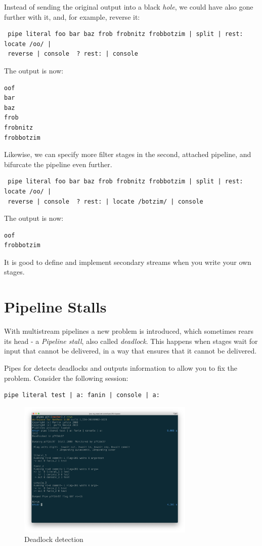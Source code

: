Instead of sending the original output into a black \emph{hole}, we
could have also gone further with it, and, for example, reverse it:
\begin{lstlisting}
 pipe literal foo bar baz frob frobnitz frobbotzim | split | rest: locate /oo/ |
 reverse | console  ? rest: | console
\end{lstlisting}
The output is now:
\begin{verbatim}
oof
bar
baz
frob
frobnitz
frobbotzim
\end{verbatim}
Likewise, we can specify more filter stages in the second, attached
pipeline, and bifurcate the pipeline even further.

\begin{lstlisting}
 pipe literal foo bar baz frob frobnitz frobbotzim | split | rest: locate /oo/ |
 reverse | console  ? rest: | locate /botzim/ | console
\end{lstlisting}
The output is now:
\begin{verbatim}
oof
frobbotzim
\end{verbatim}




It is good to define and implement secondary streams when you write
your own stages.


\chapter{Pipeline Stalls}
With multistream pipelines a new problem is introduced, which
sometimes rears its head - a \emph{Pipeline stall}, also called \emph{deadlock}. This happens when stages
wait for input that cannot be delivered, in a way that ensures that it
cannot be delivered.

Pipes for \nr{} detects deadlocks and outputs information to allow you to fix the problem.  Consider the following session:
\begin{lstlisting}
pipe literal test | a: fanin | console | a:
\end{lstlisting}

\begin{figure}[h]
  \includegraphics[width=0.75\textwidth]{images/deadlock.png}
  \caption{Deadlock detection}
  \label{fig:tcpcompile}
\end{figure}

